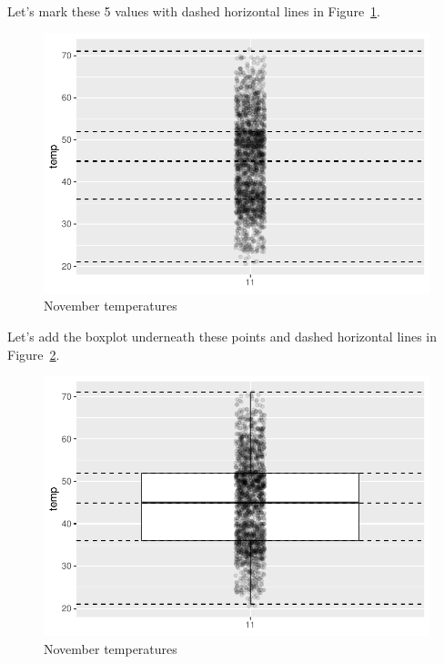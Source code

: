 \documentclass[
  letterpaper,
  DIV=11,
  numbers=noendperiod]{scrreprt}
\theoremstyle{definition}
\theoremstyle{remark}
\begin{document}
Let's mark these 5 values with dashed horizontal lines in
Figure~\ref{fig-nov2}.

\begin{figure}

{\centering \includegraphics{02-visualization_files/figure-pdf/fig-nov2-1.pdf}

}

\caption{\label{fig-nov2}November temperatures}

\end{figure}

Let's add the boxplot underneath these points and dashed horizontal
lines in Figure~\ref{fig-nov3}.

\begin{figure}

{\centering \includegraphics{02-visualization_files/figure-pdf/fig-nov3-1.pdf}

}

\caption{\label{fig-nov3}November temperatures}

\end{figure}
\end{document}
